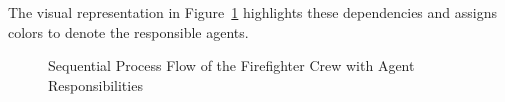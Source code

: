 The visual representation in Figure~\ref{fig:firefighter_flow} highlights these dependencies and assigns colors to denote the responsible agents.

\begin{figure}[h!]
	\centering
	\caption{Sequential Process Flow of the Firefighter Crew with Agent Responsibilities}
	\label{fig:firefighter_flow}
\end{figure}

